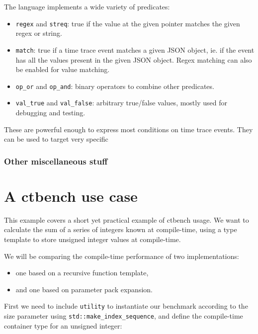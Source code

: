 \documentclass[../../main.tex]{subfiles}
\begin{document}
The language implements a wide variety of predicates:

\begin{itemize}
\item \lstinline{regex} and \lstinline{streq}: true if the value at the given
      pointer matches the given regex or string.
\item \lstinline{match}: true if a time trace event matches a given JSON object,
      ie. if the event has all the values present in the given JSON object.
      Regex matching can also be enabled for value matching.
\item \lstinline{op_or} and \lstinline{op_and}: binary operators to combine
      other predicates.
\item \lstinline{val_true} and \lstinline{val_false}: arbitrary true/false
      values, mostly used for debugging and testing.
\end{itemize}

These are powerful enough to express most conditions on time trace events.
They can be used to target very specific

\subsubsection{Other miscellaneous stuff}


\section{A ctbench use case}

This example covers a short yet practical example of ctbench usage. We want to
calculate the sum of a series of integers known at compile-time, using a type
template to store unsigned integer values at compile-time.

We will be comparing the compile-time performance of two implementations:

\begin{itemize}
\item one based on a recursive function template,
\item and one based on  parameter pack expansion.
\end{itemize}

First we need to include \lstinline{utility} to instantiate our benchmark
according to the size parameter using \lstinline{std::make_index_sequence}, and
define the compile-time container type for an unsigned integer:
\end{document}
